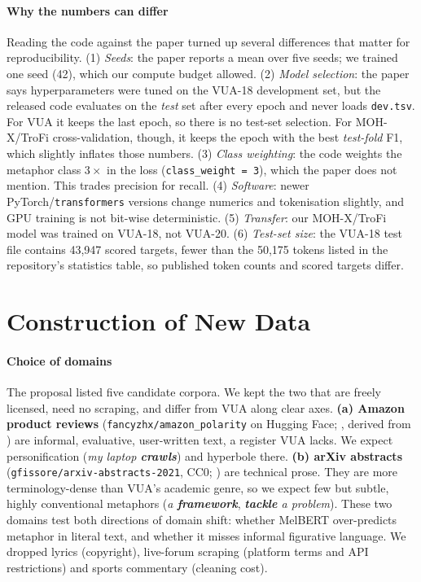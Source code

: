 \documentclass[11pt]{article}
\begin{document}
\paragraph{Why the numbers can differ} Reading the code against the paper turned up several differences that matter for reproducibility.
(1) \emph{Seeds}: the paper reports a mean over five seeds; we trained one seed (42), which our compute budget allowed.
(2) \emph{Model selection}: the paper says hyperparameters were tuned on the VUA-18 development set, but the released code evaluates on the \emph{test} set after every epoch and never loads \texttt{dev.tsv}. For VUA it keeps the last epoch, so there is no test-set selection. For MOH-X/TroFi cross-validation, though, it keeps the epoch with the best \emph{test-fold} F1, which slightly inflates those numbers.
(3) \emph{Class weighting}: the code weights the metaphor class $3\times$ in the loss (\texttt{class\_weight = 3}), which the paper does not mention. This trades precision for recall.
(4) \emph{Software}: newer PyTorch/\texttt{transformers} versions change numerics and tokenisation slightly, and GPU training is not bit-wise deterministic.
(5) \emph{Transfer}: our MOH-X/TroFi model was trained on VUA-18, not VUA-20. (6) \emph{Test-set size}: the VUA-18 test file contains 43,947 scored targets, fewer than the 50,175 tokens listed in the repository's statistics table, so published token counts and scored targets differ.

\section{Construction of New Data}
\label{sec:newdata}

\paragraph{Choice of domains} The proposal listed five candidate corpora. We kept the two that are freely licensed, need no scraping, and differ from VUA along clear axes. \textbf{(a) Amazon product reviews} (\texttt{fancyzhx/amazon\_polarity} on Hugging Face; \citealp{zhang2015character}, derived from \citealp{mcauley2013hidden}) are informal, evaluative, user-written text, a register VUA lacks. We expect personification (\textit{my laptop \textbf{crawls}}) and hyperbole there. \textbf{(b) arXiv abstracts} (\texttt{gfissore/arxiv-abstracts-2021}, CC0; \citealp{clement2019arxiv}) are technical prose. They are more terminology-dense than VUA's academic genre, so we expect few but subtle, highly conventional metaphors (\textit{a \textbf{framework}}, \textit{\textbf{tackle} a problem}). These two domains test both directions of domain shift: whether MelBERT over-predicts metaphor in literal text, and whether it misses informal figurative language. We dropped lyrics (copyright), live-forum scraping (platform terms and API restrictions) and sports commentary (cleaning cost).
\end{document}
